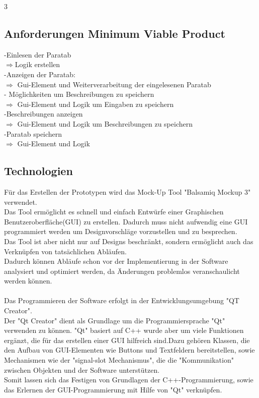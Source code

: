 3\documentclass[12pt,a4paper]{article}
\begin{document}
\subsection{Anforderungen Minimum Viable Product}
-Einlesen der Paratab\\
 $\Rightarrow$Logik erstellen\\
-Anzeigen der Paratab:\\
 $\Rightarrow$ Gui-Element und Weiterverarbeitung der eingelesenen Paratab\\
- Möglichkeiten um Beschreibungen zu speichern \\
 $\Rightarrow$ Gui-Element und Logik um Eingaben zu speichern\\
-Beschreibungen anzeigen\\
 $\Rightarrow$ Gui-Element und Logik um Beschreibungen zu speichern\\
-Paratab speichern\\
$\Rightarrow$ Gui-Element und Logik 
\\


\subsection{Technologien}
Für das Erstellen der Prototypen wird das Mock-Up Tool "Balsamiq Mockup 3" verwendet.\\
Das Tool ermöglicht es schnell und einfach Entwürfe einer Graphischen Benutzeroberfläche(GUI) zu erstellen. Dadurch muss nicht aufwendig eine GUI programmiert werden um Designvorschläge vorzustellen und zu besprechen. \\
Das Tool ist aber nicht nur auf Designs beschränkt, sondern ermöglicht auch das Verknüpfen von tatsächlichen Abläufen.\\
Dadurch können Abläufe schon vor der Implementierung in der Software analysiert und optimiert werden, da Änderungen problemlos veranschaulicht werden können.
\\ \\
Das Programmieren der Software erfolgt in der Entwicklungsumgebung "QT Creator". \\
Der "Qt Creator" dient als Grundlage um die Programmiersprache "Qt" verwenden zu können. "Qt" basiert auf C++ wurde aber um viele Funktionen ergänzt, die für das erstellen einer GUI hilfreich sind.Dazu gehören Klassen, die den Aufbau von GUI-Elementen wie Buttons und Textfeldern bereitstellen, sowie Mechanismen wie der "signal-slot Mechanismus", die die "Kommunikation" zwischen Objekten und der Software unterstützen.\\
 Somit lassen sich das Festigen von Grundlagen der C++-Programmierung, sowie das Erlernen der GUI-Programmierung mit Hilfe von "Qt" verknüpfen.\\
\end{document}
